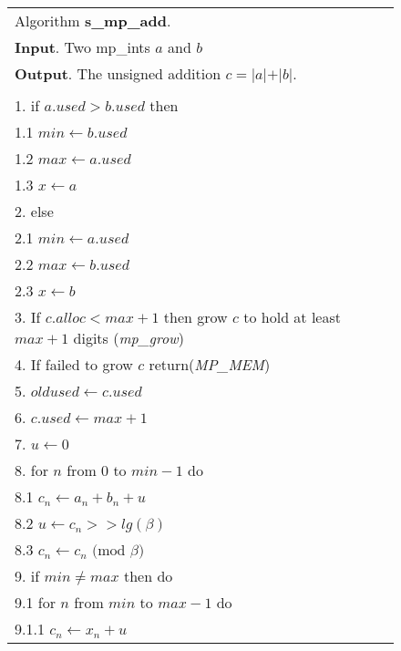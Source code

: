 \documentclass[b5paper]{book}
\begin{document}
\newpage
\begin{figure}[!here]
\begin{center}
\begin{small}
\begin{tabular}{l}
\hline Algorithm \textbf{s\_mp\_add}. \\
\textbf{Input}.   Two mp\_ints $a$ and $b$ \\
\textbf{Output}.  The unsigned addition $c = \vert a \vert + \vert b \vert$. \\
\hline \\
1.  if $a.used > b.used$ then \\
\hspace{+3mm}1.1  $min \leftarrow b.used$ \\
\hspace{+3mm}1.2  $max \leftarrow a.used$ \\
\hspace{+3mm}1.3  $x   \leftarrow a$ \\
2.  else  \\
\hspace{+3mm}2.1  $min \leftarrow a.used$ \\
\hspace{+3mm}2.2  $max \leftarrow b.used$ \\
\hspace{+3mm}2.3  $x   \leftarrow b$ \\
3.  If $c.alloc < max + 1$ then grow $c$ to hold at least $max + 1$ digits (\textit{mp\_grow}) \\
4.  If failed to grow $c$ return(\textit{MP\_MEM}) \\
5.  $oldused \leftarrow c.used$ \\
6.  $c.used \leftarrow max + 1$ \\
7.  $u \leftarrow 0$ \\
8.  for $n$ from $0$ to $min - 1$ do \\
\hspace{+3mm}8.1  $c_n \leftarrow a_n + b_n + u$ \\
\hspace{+3mm}8.2  $u \leftarrow c_n >> lg(\beta)$ \\
\hspace{+3mm}8.3  $c_n \leftarrow c_n \mbox{ (mod }\beta\mbox{)}$ \\
9.  if $min \ne max$ then do \\
\hspace{+3mm}9.1  for $n$ from $min$ to $max - 1$ do \\
\hspace{+6mm}9.1.1  $c_n \leftarrow x_n + u$ \\

\end{tabular}
\end{small}
\end{center}
\end{figure}
\end{document}
